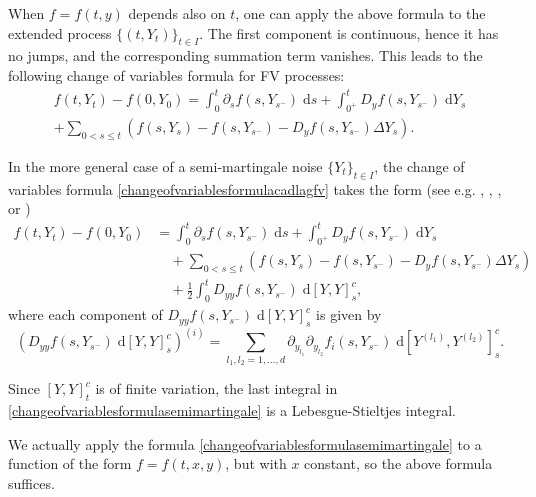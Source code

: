 \documentclass[reqno,12pt]{amsart}
\theoremstyle{plain} %
\theoremstyle{definition} %
\begin{document}
When $f=f(t, y)$ depends also on $t$, one can apply the above formula to the extended process $\{(t, Y_t)\}_{t\in I}$. The first component is continuous, hence it has no jumps, and the corresponding summation term vanishes. This leads to the following change of variables formula for FV processes:
\begin{multline}
    \label{changeofvariablesformulacadlagfv}
    f(t, Y_t) - f(0, Y_0) = \int_0^t \partial_s f(s, Y_{s^-})\;\mathrm{d}s + \int_{0^+}^t D_y f(s, Y_{s^-}) \;\mathrm{d}Y_s \\
    + \sum_{0 < s \leq t} \left( f(s, Y_s) - f(s, Y_{s^{-}}) - D_y f(s, Y_{s^-})\Delta Y_s\right).
\end{multline}

In the more general case of a semi-martingale noise $\{Y_t\}_{t\in I}$, the change of variables formula \cref{changeofvariablesformulacadlagfv} takes the form (see e.g. \cite[Theorems II.32 and II.33]{Protter2005}, \cite[Section 1.3.3]{AitSahaliaJacod2014}, \cite[Theorem 3.6]{KaratzasShreve2014}, or \cite[Theorem 9.35]{HeWangYan1992})
\begin{equation}
    \label{changeofvariablesformulasemimartingale}
    \begin{aligned}
        f(t, Y_t) - f(0, Y_0) & = \int_0^t \partial_s f(s, Y_{s^-})\;\mathrm{d}s + \int_{0^+}^t D_y f(s, Y_{s^-}) \;\mathrm{d}Y_s \\
        & \quad + \sum_{0 < s \leq t} \left( f(s, Y_s) - f(s, Y_{s^{-}}) - D_y f(s, Y_{s^-})\Delta Y_s\right) \\
        & \quad + \frac{1}{2}\int_0^t D_{yy}f(s, Y_{s^-})\;\mathrm{d}[Y, Y]_s^c,
    \end{aligned}
\end{equation}
where each component of $D_{yy}f(s, Y_{s^-})\;\mathrm{d}[Y, Y]_s^c$ is given by
\[ \left(D_{yy}f(s, Y_{s^-})\;\mathrm{d}[Y, Y]_s^c\right)^{(i)} = \sum_{l_1, l_2 = 1, \ldots, d} \partial_{y_{l_1}}\partial_{y_{l_2}} f_i(s, Y_{s^-})\;\mathrm{d}[Y^{(l_1)}, Y^{(l_2)}]_s^c.
\]

Since $[Y, Y]_t^c$ is of finite variation, the last integral in \cref{changeofvariablesformulasemimartingale} is a Lebesgue-Stieltjes integral.

We actually apply the formula \cref{changeofvariablesformulasemimartingale} to a function of the form $f=f(t, x, y)$, but with $x$ constant, so the above formula suffices.
\end{document}
